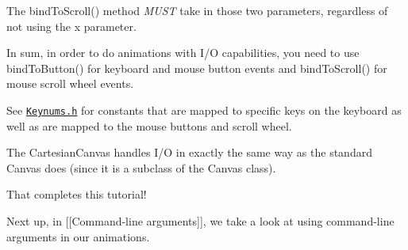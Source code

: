 The bind\+To\+Scroll() method {\itshape M\+U\+S\+T} take in those two parameters, regardless of not using the x parameter.

In sum, in order to do animations with I/\+O capabilities, you need to use bind\+To\+Button() for keyboard and mouse button events and bind\+To\+Scroll() for mouse scroll wheel events.

See \href{http://calvin-cs.github.io/TSGL/html/_keynums_8h_source.html}{\tt Keynums.\+h} for constants that are mapped to specific keys on the keyboard as well as are mapped to the mouse buttons and scroll wheel.

The Cartesian\+Canvas handles I/\+O in exactly the same way as the standard Canvas does (since it is a subclass of the Canvas class).

That completes this tutorial!

Next up, in \mbox{[}\mbox{[}Command-\/line arguments\mbox{]}\mbox{]}, we take a look at using command-\/line arguments in our animations. 